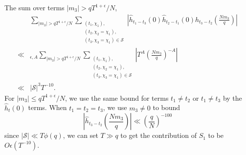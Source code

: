 The sum over terms $|m_3|>qT^{1+\epsilon}/N$,
\begin{align*}
   & \sum_{|m_3|>qT^{1+\epsilon}/N}\sum_{\substack{(t_1,\chi_1),\\(t_2,\chi_2=\chi_1),\\(t_3,\chi_3=\chi_1)\in\mathcal{S}}} 
   \left|\hat{h}_{t_1-t_3}\left(0\right)\hat{h}_{t_2-t_1}\left(0\right)\hat{h}_{t_3-t_2}\left(\frac{Nm_3}{q}\right)\right|\\
    \ll&_{\epsilon,A}  \sum_{|m_3|>qT^{1+\epsilon}/N}\sum_{\substack{(t_1,\chi_1),\\(t_2,\chi_2=\chi_1),\\(t_3,\chi_3=\chi_1)\in\mathcal{S}}} 
    \left|T^{A}\left(\frac{Nm_3}{q} \right)^{-A}\right|\\
    \ll & |\mathcal{S}|^3 T^{-10}.
\end{align*}
For $|m_3|\leq qT^{1+\epsilon}/N$, we use the same bound for terms $t_1\neq t_2$ or $t_1\neq t_3$ by the $\hat{h}_t(0)$ terms. When $t_1=t_2=t_3$, we use $m_3\neq 0$
to bound \[
    \left|\hat{h}_{t_3-t_2}\left(\frac{Nm_3}{q}\right)\right| \ll \left(\frac{q}{N}\right)^{-100}
\]
since $|\mathcal{S}|\ll T\phi(q)$, we can set $T\gg q$ to get the contribution of $S_1$ to be $O\epsilon(T^{-10})$.
